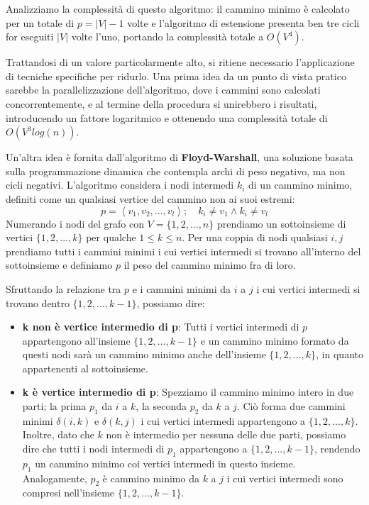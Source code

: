 \noindent Analizziamo la complessità di questo algoritmo: il cammino minimo è calcolato per un totale di $p = |V|-1$ volte e l'algoritmo di estensione
presenta ben tre cicli for eseguiti $|V|$ volte l'uno, portando la complessità totale a $O(V^4)$.\par
Trattandosi di un valore particolarmente alto, si ritiene necessario l'applicazione di tecniche specifiche per ridurlo. Una prima idea da un punto di
vista pratico sarebbe la parallelizzazione dell'algoritmo, dove i cammini sono calcolati concorrentemente, e al termine della procedura si unirebbero
i risultati, introducendo un fattore logaritmico e ottenendo una complessità totale di $O(V^3log(n))$.\par
Un'altra idea è fornita dall'algoritmo di \textbf{Floyd-Warshall}, una soluzione basata sulla programmazione dinamica che contempla archi di peso
negativo, ma non cicli negativi. L'algoritmo considera i nodi intermedi $k_i$ di un cammino minimo, definiti come un qualsiasi vertice del cammino non
ai suoi estremi: \[
p = \left<v_1, v_2, ..., v_l\right>;\quad k_i \neq v_1 \land k_i\neq v_l
\]
\noindent Numerando i nodi del grafo con $V = \{1, 2, ..., n\}$ prendiamo un sottoinsieme di vertici $\{1, 2, ..., k\}$ per qualche $1\leq k\leq n$. Per
una coppia di nodi qualsiasi $i,j$ prendiamo tutti i cammini minimi i cui vertici intermedi si trovano all'interno del sottoinsieme e definiamo $p$ il
peso del cammino minimo fra di loro.\par
Sfruttando la relazione tra $p$ e i cammini minimi da $i$ a $j$ i cui vertici intermedi si trovano dentro $\{1, 2, ..., k-1\}$, possiamo dire: 
\begin{itemize}
	\item \textbf{k non è vertice intermedio di p}: Tutti i vertici intermedi di $p$ appartengono all'insieme $\{1, 2, ..., k-1\}$ e un cammino
	minimo formato da questi nodi sarà un cammino minimo anche dell'insieme $\{1, 2, ..., k\}$, in quanto appartenenti al sottoinsieme.
	\item \textbf{k è vertice intermedio di p}: Spezziamo il cammino minimo intero in due parti; la prima $p_1$ da $i$ a $k$, la seconda $p_2$ da $k$ a
	$j$. Ciò forma due cammini minimi $\delta(i, k)$ e $\delta(k, j)$ i cui vertici intermedi appartengono a $\{1, 2, ..., k\}$. Inoltre, dato che $k$
	non è intermedio per nessuna delle due parti, possiamo dire che tutti i nodi intermedi di $p_1$ appartengono a $\{1, 2, ..., k-1\}$, rendendo $p_1$
	un cammino minimo coi vertici intermedi in questo insieme. Analogamente, $p_2$ è cammino minimo da $k$ a $j$ i cui vertici intermedi sono compresi
	nell'insieme $\{1, 2, ..., k-1\}$.
\end{itemize}

